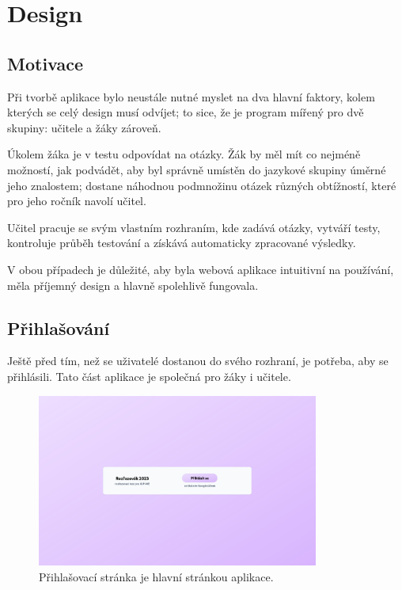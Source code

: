 \hypertarget{Design}{\chapter{Design}}

\section{Motivace}

Při tvorbě aplikace bylo neustále nutné myslet na dva hlavní faktory, kolem kterých se celý design musí odvíjet; to sice, že je program mířený pro dvě skupiny: učitele a žáky zároveň. 

Úkolem žáka je v testu odpovídat na otázky. Žák by měl mít co nejméně možností, jak podvádět, aby byl správně umístěn do jazykové skupiny úměrné jeho znalostem; dostane náhodnou podmnožinu otázek různých obtížností, které pro jeho ročník navolí učitel.

Učitel pracuje se svým vlastním rozhraním, kde zadává otázky, vytváří testy, kontroluje průběh testování a získává automaticky zpracované výsledky.

V obou případech je důležité, aby byla webová aplikace intuitivní na používání, měla příjemný design a hlavně spolehlivě fungovala.

\section{Přihlašování}

Ještě před tím, než se uživatelé dostanou do svého rozhraní, je potřeba, aby se přihlásili. Tato část aplikace je společná pro žáky i učitele. 

\begin{figure}[H]
    \centering
    \includegraphics[width=350px]{images/01design/login.png}
    \caption{Přihlašovací stránka je hlavní stránkou aplikace.}
\end{figure}

